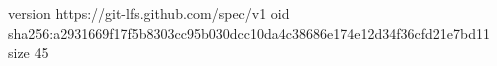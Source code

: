 version https://git-lfs.github.com/spec/v1
oid sha256:a2931669f17f5b8303cc95b030dcc10da4c38686e174e12d34f36cfd21e7bd11
size 45
